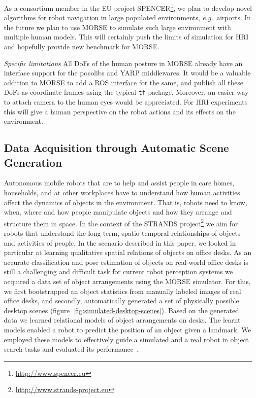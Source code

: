 \documentclass[conference]{IEEEtran}
\newcommand{\eg}{{\textit{e.g.~}}}
\begin{document}
As a consortium member in the EU project
SPENCER\footnote{\url{http://www.spencer.eu}}, we plan to develop novel
algorithms for robot navigation in large populated environments, \eg airports.
In the future we plan to use MORSE to simulate such large environment with
multiple human models. This will certainly push the limits of simulation for HRI
and hopefully provide new benchmark for MORSE.

\emph{Specific limitations} All DoFs of the human posture in MORSE already have an
interface support for the {\sc pocolibs} and YARP middlewares. It would be a valuable
addition to MORSE to add a ROS interface for the same, and publish all these
DoFs as coordinate frames using the typical {\tt tf} package. Moreover, an easier
way to attach camera to the human eyes would be appreciated. For HRI experiments
this will give a human perspective on the robot actions and its effects on the
environment.


\subsection{Data Acquisition through Automatic Scene Generation}
\label{sc:generation}

Autonomous mobile robots that are to help and assist people in care homes,
households, and at other workplaces have to understand how human activities
affect the dynamics of objects in the environment. That is, robots need to know,
when, where and how people manipulate objects and how they arrange and structure
them in space. In the context of the STRANDS
project\footnote{\url{http://www.strands-project.eu}} we aim for robots that
understand the long-term, spatio-temporal relationships of objects and
activities of people. In the scenario described in this paper, we looked in
particular at learning qualitative spatial relations of objects on office desks.
As an accurate classification and pose estimation of objects on real-world
office desks is still a challenging and difficult task for current robot
perception systems we acquired a data set of object arrangements using the MORSE
simulator. For this, we first bootstrapped an object statistics from manually
labeled images of real office desks, and secondly, automatically generated a set
of physically possible desktop scenes
(figure~\ref{fig:simulated-desktop-scenes}). Based on the generated data we
learned relational models of object arrangements on desks. The learnt models
enabled a robot to predict the position of an object given a landmark. We
employed these models to effectively guide a simulated and a real robot in
object search tasks and evaluated its performance~\cite{kunze14indirect}.
\end{document}

